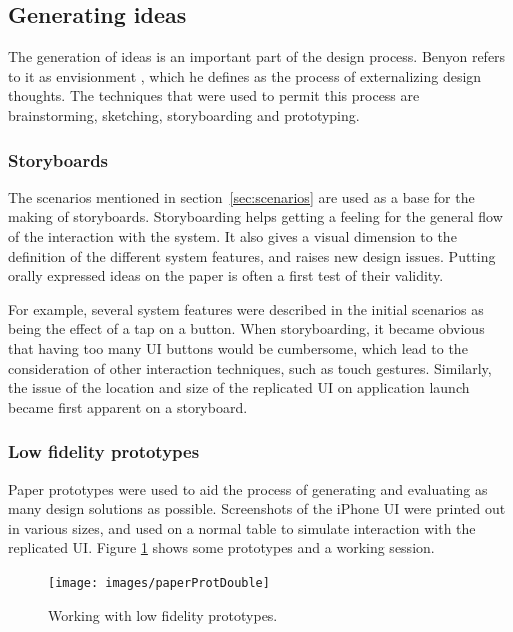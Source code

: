 \subsection{Generating ideas}

The generation of ideas is an important part of the design process.
Benyon refers to it as envisionment \citep{Benyon:2010}, which he defines as the process of externalizing design thoughts.
The techniques that were used to permit this process are brainstorming, sketching, storyboarding and prototyping.

\subsubsection{Storyboards}

The scenarios mentioned in section~\ref{sec:scenarios} are used as a base for the making of storyboards.
Storyboarding helps getting a feeling for the general flow of the interaction with the system.
It also gives a visual dimension to the definition of the different system features, and raises new design issues.
Putting orally expressed ideas on the paper is often a first test of their validity.

For example, several system features were described in the initial scenarios as being the effect of a tap on a button.
When storyboarding, it became obvious that having too many UI buttons would be cumbersome, which lead to the consideration of other interaction techniques, such as touch gestures.
Similarly, the issue of the location and size of the replicated UI on application launch became first apparent on a storyboard.

\subsubsection{Low fidelity prototypes}

Paper prototypes were used to aid the process of generating and evaluating as many design solutions as possible.
Screenshots of the iPhone UI \citep{iphone} were printed out in various sizes, and used on a normal table to simulate interaction with the replicated UI.
Figure \ref{paperProt} shows some prototypes and a working session.

\begin{figure}[htb]
  \centering
    \texttt{[image: images/paperProtDouble]}
  \caption{Working with low fidelity prototypes.}
  \label{paperProt}
\end{figure}

